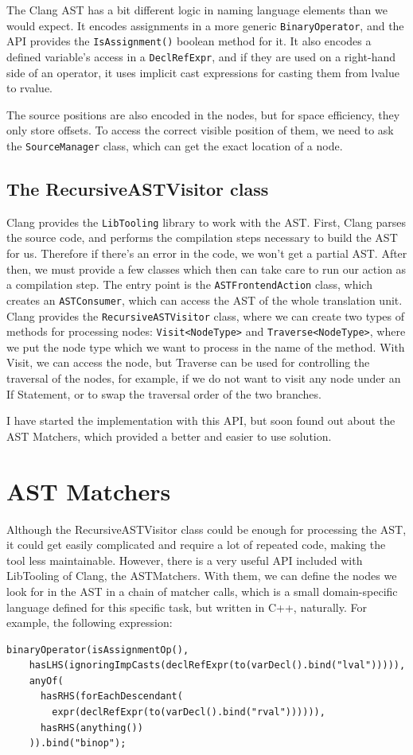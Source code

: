 \documentclass[oneside,12pt,a4paper]{book}
\begin{document}
The Clang AST has a bit different logic in naming language elements than we would expect. It encodes assignments in a more generic \texttt{BinaryOperator}, and the API provides the \texttt{IsAssignment()} boolean method for it. It also encodes a defined variable's access in a \texttt{DeclRefExpr}, and if they are used on a right-hand side of an operator, it uses implicit cast expressions for casting them from lvalue to rvalue.

The source positions are also encoded in the nodes, but for space efficiency, they only store offsets. To access the correct visible position of them, we need to ask the \texttt{SourceManager} class, which can get the exact location of a node. 

\subsection{The RecursiveASTVisitor class}

Clang provides the \texttt{LibTooling} library to work with the AST. First, Clang parses the source code, and performs the compilation steps necessary to build the AST for us. Therefore if there's an error in the code, we won't get a partial AST. After then, we must provide a few classes which then can take care to run our action as a compilation step. The entry point is the \texttt{ASTFrontendAction} class, which creates an \texttt{ASTConsumer}, which can access the AST of the whole translation unit. Clang provides the \texttt{RecursiveASTVisitor} class, where we can create two types of methods for processing nodes: \texttt{Visit<NodeType>} and \texttt{Traverse<NodeType>}, where we put the node type which we want to process in the name of the method. With Visit, we can access the node, but Traverse can be used for controlling the traversal of the nodes, for example, if we do not want to visit any node under an If Statement, or to swap the traversal order of the two branches.

I have started the implementation with this API, but soon found out about the AST Matchers, which provided a better and easier to use solution.

\section{AST Matchers}

Although the RecursiveASTVisitor class could be enough for processing the AST, it could get easily complicated and require a lot of repeated code, making the tool less maintainable. However, there is a very useful API included with LibTooling of Clang, the ASTMatchers. With them, we can define the nodes we look for in the AST in a chain of matcher calls, which is a small domain-specific language defined for this specific task, but written in C++, naturally. For example, the following expression:
\begin{lstlisting}
binaryOperator(isAssignmentOp(),
    hasLHS(ignoringImpCasts(declRefExpr(to(varDecl().bind("lval"))))),
    anyOf(
      hasRHS(forEachDescendant(
      	expr(declRefExpr(to(varDecl().bind("rval")))))),
      hasRHS(anything())
    )).bind("binop");
\end{lstlisting}
\end{document}
